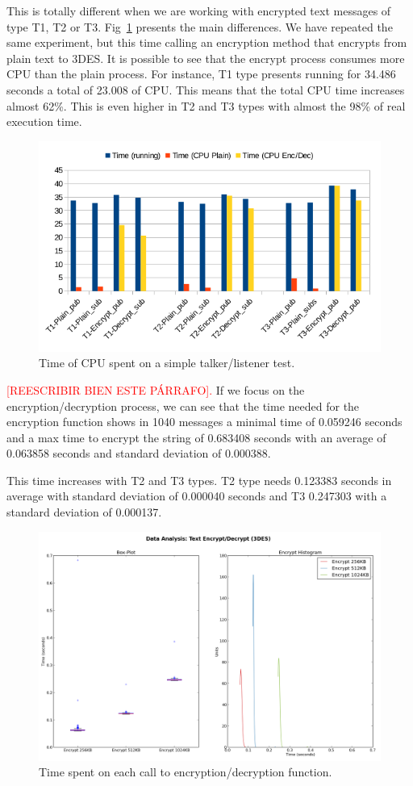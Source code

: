 \documentclass[journal,twoside]{JoPhA}
\begin{document}
This is totally different when we are working with encrypted text messages of type T1, T2 or T3. Fig~\ref{fig:time_text_CPU} presents the main differences. We have repeated the same experiment, but this time calling an encryption method that encrypts from plain text to 3DES. It is possible to see that the encrypt process consumes more CPU than  the plain process.
For instance, T1 type presents running for 34.486 seconds a total of 23.008 of CPU. This means that the total CPU time increases almost 62\%. This is even higher in T2 and T3 types with almost the 98\% of real execution time.

\begin{figure}[ht!]
    \centering
    \includegraphics[width=.5\textwidth]{Text_plain_vs_encrypted.png}
    \caption{Time of CPU spent on a simple talker/listener test.}
  \label{fig:time_text_CPU}
\end{figure}

\textcolor{red}{[REESCRIBIR BIEN ESTE P\'ARRAFO].} If we focus on the encryption/decryption process, we can see that the time needed for the encryption function shows in 1040 messages a minimal time of 0.059246 seconds and a max time to encrypt the string of 0.683408 seconds with an average of 0.063858 seconds and standard deviation of 0.000388.

This time increases with T2 and T3 types. T2 type needs 0.123383 seconds in average with standard deviation of 0.000040 seconds and  T3  0.247303 with a standard deviation of 0.000137.




\begin{figure}[ht]
	\centering
	\includegraphics[width=.49\textwidth]{Outline_images_encryption_decrytiontime3.png}
	\caption{Time spent on each call to encryption/decryption function.}
	\label{fig:text_encryption_time}
\end{figure}
\end{document}
